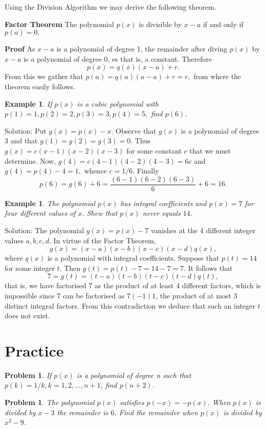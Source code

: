 \documentclass[11pt, openany]{book}
\theoremstyle{change} \theoremheaderfont{\blue\sffamily\bfseries}
\newtheorem{exa}[thm]{Example}
\newtheorem{pro}[thm]{Problem}
\theoremstyle{nonumberplain} \theoremheaderfont{\sffamily\bfseries}
\newcommand{\í}{\'{\i}}
\begin{document}
Using the Division Algorithm we may derive the following theorem.
\begin{thm}
{\bf Factor Theorem} The polynomial $p(x)$ is divisible by $x - a$
if and only if $p(a) = 0.$
\end{thm}
{\bf Proof}  As $x - a$ is a polynomial of degree 1, the remainder
after diving $p(x)$ by $x - a$ is a polynomial of degree 0, es
that is, a constant. Therefore
$$p(x) = q(x)(x - a) + r.$$From this we gather that  $p(a) = q(a)(a - a) + r = r,$
from where the theorem easily follows.
\begin{exa} If $p(x)$  is a cubic polynomial with $p(1) = 1, p(2) = 2, p(3) = 3, p(4) = 5,$
find $p(6)$. \end{exa} Solution: Put $g(x) = p(x) - x$. Observe
that $g(x)$ is a polynomial of degree 3 and that  $g(1) = g(2) =
g(3) = 0.$ Thus $g(x) = c(x - 1)(x - 2)(x - 3)$ for some constant
$c$ that we must determine. Now, $g(4) = c(4 - 1)(4 - 2) (4 - 3) =
6c$ and $g(4) = p(4) - 4 = 1,$ whence $c = 1/6.$ Finally
$$p(6) = g(6) + 6 = \frac{(6 - 1)(6 - 2)(6 - 3)}{6} + 6 = 16.$$
\begin{exa}  The polynomial $p(x)$ has integral coefficients and $p(x) = 7$ for four different
values of $x$. Shew that $p(x)$ never equals $14$.  \end{exa}
Solution: The polynomial $g(x) = p(x) - 7$ vanishes at the 4
different integer values $a, b, c, d$. In virtue of the Factor
Theorem, $$g(x) = (x - a)(x - b)(x - c)(x - d)q(x),$$ where $q(x)$
is a polynomial with integral coefficients. Suppose that $p(t) =
14$ for some integer $t$.  Then $g(t) = p(t) - 7 = 14 - 7 = 7.$ It
follows that
$$7 = g(t) = (t - a)(t - b)(t - c)(t - d)q(t),$$that is, we have factorised 7 as the product of
at least 4 different factors, which is impossible since  7 can be
factorised as $7(-1)1$, the product of at most 3 distinct integral
factors. From this contradiction we deduce that such an integer
$t$ does not exist.
\section*{Practice}\begin{multicols}{2}\columnseprule 1pt \columnsep 25pt


\begin{pro}
If $p(x)$ is a polynomial of degree n such that $p(k) = 1/k, k =
1, 2, \ldots , n + 1$, find $p(n + 2)$.
\end{pro}
\begin{pro}
The polynomial $p(x)$ satisfies $p(-x) = -p(x).$ When $p(x)$ is
divided by $x - 3$ the remainder is $6$. Find the remainder when
$p(x)$ is divided by $x^2 - 9$.
\end{pro}
\end{multicols}
\end{document}
